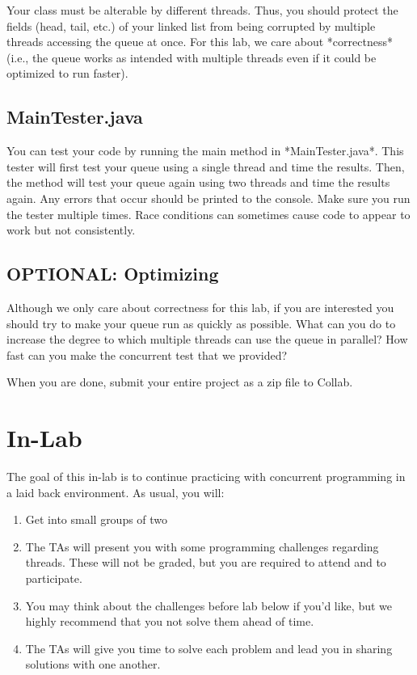 \documentclass[paper=a4, fontsize=11pt, parskip=full]{scrartcl} %
\numberwithin{equation}{section} %
\numberwithin{figure}{section} %
\numberwithin{table}{section} %
\begin{document}
Your class must be alterable by different threads. Thus, you should protect the fields (head, tail, etc.) of your linked list from being corrupted by multiple threads accessing the queue at once. For this lab, we care about *correctness* (i.e., the queue works as intended with multiple threads even if it could be optimized to run faster).

\subsection{MainTester.java}

You can test your code by running the main method in *MainTester.java*. This tester will first test your queue using a single thread and time the results. Then, the method will test your queue again using two threads and time the results again. Any errors that occur should be printed to the console. Make sure you run the tester multiple times. Race conditions can sometimes cause code to appear to work but not consistently. 

\subsection{OPTIONAL: Optimizing}

Although we only care about correctness for this lab, if you are interested you should try to make your queue run as quickly as possible. What can you do to increase the degree to which multiple threads can use the queue in parallel? How fast can you make the concurrent test that we provided?

When you are done, submit your entire project as a zip file to Collab.



\newpage
\section{In-Lab}

The goal of this in-lab is to continue practicing with concurrent programming in a laid back environment. As usual, you will:

\begin{enumerate}
	\item Get into small groups of two
	\item The TAs will present you with some programming challenges regarding threads. These will not be graded, but you are required to attend and to participate.
	\item You may think about the challenges before lab below if you'd like, but we highly recommend that you not solve them ahead of time.
	\item The TAs will give you time to solve each problem and lead you in sharing solutions with one another.
\end{enumerate}
\end{document}
